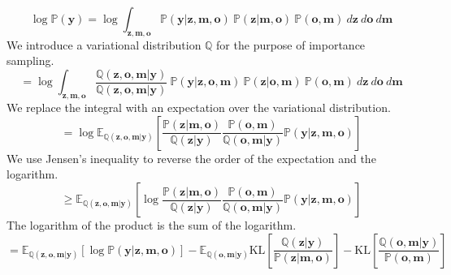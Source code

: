 \documentclass[a4paper,12pt,twoside,openright]{article}
\begin{document}
\begin{equation*}
    \log \mathbb{P}(\mathbf{y}) = \log \int_{\mathbf{z}, \mathbf{m}, \mathbf{o}} \mathbb{P}(\mathbf{y} | \mathbf{z}, \mathbf{m}, \mathbf{o}) ~ \mathbb{P}(\mathbf{z} | \mathbf{m}, \mathbf{o}) ~ \mathbb{P}(\mathbf{o} , \mathbf{m}) ~ d\mathbf{z} ~ d\mathbf{o} ~ d\mathbf{m}
\end{equation*}
We introduce a variational distribution $\mathbb{Q}$ for the purpose of importance sampling.
\begin{equation*} 
    = \log \int_{\mathbf{z}, \mathbf{m}, \mathbf{o}} \frac{\mathbb{Q}(\mathbf{z}, \mathbf{o}, \mathbf{m} | \mathbf{y})}{\mathbb{Q}(\mathbf{z}, \mathbf{o}, \mathbf{m} | \mathbf{y})} ~ \mathbb{P}(\mathbf{y} | \mathbf{z}, \mathbf{o}, \mathbf{m}) ~ \mathbb{P}(\mathbf{z} |\mathbf{o}, \mathbf{m}) ~ \mathbb{P}(\mathbf{o}, \mathbf{m}) ~ d\mathbf{z} ~ d\mathbf{o} ~ d\mathbf{m}
\end{equation*}
We replace the integral with an expectation over the variational distribution.
\begin{equation*}
    = \log \mathbb{E}_{\mathbb{Q}(\mathbf{z}, \mathbf{o}, \mathbf{m} | \mathbf{y})} \left[ \frac{\mathbb{P}(\mathbf{z} | \mathbf{m}, \mathbf{o})}{\mathbb{Q}(\mathbf{z} | \mathbf{y})} \frac{\mathbb{P}(\mathbf{o} , \mathbf{m})}{\mathbb{Q}(\mathbf{o}, \mathbf{m} | \mathbf{y})} \mathbb{P}(\mathbf{y} | \mathbf{z}, \mathbf{m}, \mathbf{o}) \right]
\end{equation*}
We use Jensen's inequality to reverse the order of the expectation and the logarithm.
\begin{equation*}
    \geq \mathbb{E}_{\mathbb{Q}(\mathbf{z}, \mathbf{o}, \mathbf{m} | \mathbf{y})} \left[ \log \frac{\mathbb{P}(\mathbf{z} | \mathbf{m}, \mathbf{o})}{\mathbb{Q}(\mathbf{z} | \mathbf{y})} \frac{\mathbb{P}(\mathbf{o} , \mathbf{m})}{\mathbb{Q}(\mathbf{o}, \mathbf{m} | \mathbf{y})} \mathbb{P}(\mathbf{y} | \mathbf{z}, \mathbf{m}, \mathbf{o}) \right]
\end{equation*}
The logarithm of the product is the sum of the logarithm.
\begin{equation*}
    = \mathbb{E}_{\mathbb{Q}(\mathbf{z}, \mathbf{o}, \mathbf{m} | \mathbf{y})} \left[ \log \mathbb{P}(\mathbf{y} | \mathbf{z}, \mathbf{m}, \mathbf{o}) \right] - \mathbb{E}_{\mathbb{Q}(\mathbf{o}, \mathbf{m} | \mathbf{y})} \mathrm{KL} \left[ \frac{\mathbb{Q}(\mathbf{z} | \mathbf{y})}{\mathbb{P}(\mathbf{z} | \mathbf{m}, \mathbf{o})} \right] - \mathrm{KL} \left[ \frac{\mathbb{Q}(\mathbf{o}, \mathbf{m}| \mathbf{y})}{\mathbb{P}(\mathbf{o} , \mathbf{m})} \right]
\end{equation*}
\end{document}
